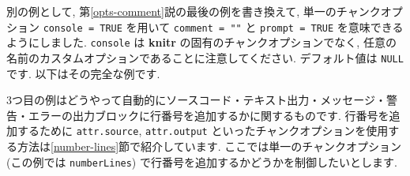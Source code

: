 \documentclass[
  11pt,
  lualatex,
  ja=standard]{bxjsreport}
\newenvironment{Shaded}{\begin{snugshade}}{\end{snugshade}}
\newcommand{\InformationTok}[1]{\textcolor[rgb]{0.56,0.35,0.01}{\textbf{\textit{#1}}}}
\newcommand{\NormalTok}[1]{#1}
\begin{document}
別の例として, 第\ref{opts-comment}説の最後の例を書き換えて, 単一のチャンクオプション \texttt{console = TRUE} を用いて \texttt{comment = ""} と \texttt{prompt = TRUE} を意味できるようにしました. \texttt{console} は \textbf{knitr} の固有のチャンクオプションでなく, 任意の名前のカスタムオプションであることに注意してください. デフォルト値は \texttt{NULL} です. 以下はその完全な例です.

\begin{Shaded}
\end{Shaded}

3つ目の例はどうやって自動的にソースコード・テキスト出力・メッセージ・警告・エラーの出力ブロックに行番号を追加するかに関するものです. 行番号を追加するために \texttt{attr.source}, \texttt{attr.output} といったチャンクオプションを使用する方法は\ref{number-lines}節で紹介しています. ここでは単一のチャンクオプション (この例では \texttt{numberLines}) で行番号を追加するかどうかを制御したいとします.
\end{document}
